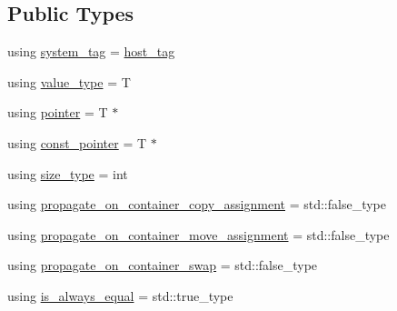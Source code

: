 \subsection*{Public Types}
\begin{DoxyCompactItemize}
\item 
using \hyperlink{structBC_1_1allocators_1_1Host_a970d265edb8b984dd4c27535ab262cb0}{system\+\_\+tag} = \hyperlink{structBC_1_1host__tag}{host\+\_\+tag}
\item 
using \hyperlink{structBC_1_1allocators_1_1Host_a0663f90f62e2b8c223a4402bef3d87e5}{value\+\_\+type} = T
\item 
using \hyperlink{structBC_1_1allocators_1_1Host_a02ff007cb4b935aea02771535ef19205}{pointer} = T $\ast$
\item 
using \hyperlink{structBC_1_1allocators_1_1Host_afee64cff8e4726203834cb86a94a5761}{const\+\_\+pointer} = T $\ast$
\item 
using \hyperlink{structBC_1_1allocators_1_1Host_ae589e96e6629045f1413c43f08aea894}{size\+\_\+type} = int
\item 
using \hyperlink{structBC_1_1allocators_1_1Host_abb579317e977037f39958b3fa43b92c7}{propagate\+\_\+on\+\_\+container\+\_\+copy\+\_\+assignment} = std\+::false\+\_\+type
\item 
using \hyperlink{structBC_1_1allocators_1_1Host_a965a8964fd4ec1851d3bec468a51d07d}{propagate\+\_\+on\+\_\+container\+\_\+move\+\_\+assignment} = std\+::false\+\_\+type
\item 
using \hyperlink{structBC_1_1allocators_1_1Host_a8ff9ef7cce3b0ffc4051c930c358512b}{propagate\+\_\+on\+\_\+container\+\_\+swap} = std\+::false\+\_\+type
\item 
using \hyperlink{structBC_1_1allocators_1_1Host_a71dcf87309308a9e792e381c233b3b1a}{is\+\_\+always\+\_\+equal} = std\+::true\+\_\+type
\end{DoxyCompactItemize}
